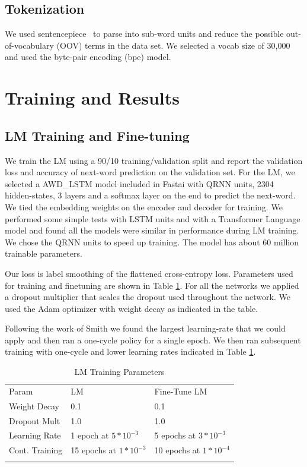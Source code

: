 \documentclass[smallextended]{svjour3}       %
\begin{document}
\subsection{Tokenization}
We used sentencepiece~\cite{SentencePiece:DBLP:journals/corr/abs-1808-06226} to parse into sub-word units and reduce the possible out-of-vocabulary (OOV) terms in the data set.  We selected a vocab size of 30,000 and used the byte-pair encoding (bpe) model. 

\section{Training and Results}
\label{sec:4}
\subsection{LM Training and Fine-tuning}
We train the LM using a 90/10 training/validation split and report the validation loss and accuracy of next-word prediction on the validation set.  For the LM, we selected a AWD\_LSTM \cite{Merity:DBLP:journals/corr/abs-1708-02182} model included in Fastai with QRNN\cite{Bradbury:DBLP:journals/corr/BradburyMXS16} units, 2304 hidden-states, 3 layers and a softmax layer on the end to predict the next-word.  We tied the embedding weights on the encoder and decoder for training.  We performed some simple tests with LSTM units and with a Transformer Language model and found all the models were similar in performance during LM training.  We chose the QRNN units to speed up training. The model has about 60 million trainable parameters.  

Our loss is label smoothing\cite{Labelsmoothing:DBLP:journals/corr/PereyraTCKH17} of the flattened cross-entropy loss. 
Parameters used for training and finetuning are shown in Table \ref{tab:tab_training}.
For all the networks we applied a dropout multiplier that scales the dropout used throughout the network.  We used the Adam optimizer with weight decay as indicated in the table.  

Following the work of Smith\cite{Smith:DBLP:journals/corr/abs-1803-09820}  we found the largest learning-rate that we could apply and then ran a one-cycle policy for a single epoch. We then ran subsequent training with one-cycle and lower learning rates indicated in Table \ref{tab:tab_training}.

\begin{table}[ht]
	\caption{LM Training Parameters}
	\label{tab:tab_training}       %
\begin{tabular}{lll}
	\hline\noalign{\smallskip}
	Param & LM & Fine-Tune LM \\
	\noalign{\smallskip}\hline\noalign{\smallskip}
	Weight Decay & 0.1 & 0.1 \\
	Dropout Mult & 1.0 & 1.0 \\
	Learning Rate & 1 epoch at $5*10^{-3}$ & 5 epochs at $3*10^{-3}$ \\
    Cont. Training & 15 epochs at $1*10^{-3}$ & 10 epochs at $1*10^{-4}$\\
	\noalign{\smallskip}\hline
\end{tabular}
\end{table}
\end{document}
